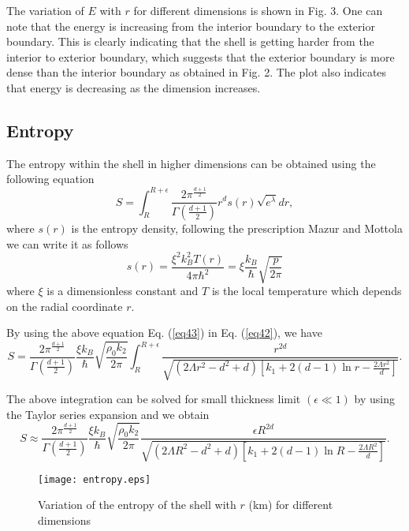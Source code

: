 \documentclass[preprint,12pt]{elsarticle}
\begin{document}
The variation of $E$ with $r$ for different dimensions is shown in Fig. 3.
One can note that the energy is increasing from the interior boundary to
the exterior boundary. This is clearly indicating that the shell is getting
harder from the interior to exterior boundary, which suggests that the
exterior boundary is more dense than the interior boundary as obtained
in Fig. 2. The plot also indicates that energy is decreasing as
the dimension increases.



\subsection{Entropy}
The entropy within the shell in higher dimensions can be obtained using the following equation
\begin{equation}
 S=\int^{R+\epsilon}_R \frac{2\pi^{\frac{d+1}{2}}}{\Gamma(\frac{d+1}{2})} r^d s(r)\sqrt{e^{\lambda}} dr,\label{eq42}
\end{equation}
where $s(r)$ is the entropy density, following the prescription Mazur and Mottola \cite{Mazur2001} we can write it as follows
\begin{equation}
 s(r)=\frac{\xi^2 k_B^2 T(r)}{4\pi\hbar^2}=\xi\frac{k_B}{\hbar}\sqrt{\frac{p}{2\pi}} \label{eq43}
\end{equation}
where $\xi$ is a dimensionless constant and $T$ is the local temperature which depends on the radial coordinate $r$.

By using the above equation Eq. (\ref{eq43}) in Eq. (\ref{eq42}), we have
\begin{equation}
S =  \frac{2\pi^{\frac{d+1}{2}}}{\Gamma(\frac{d+1}{2})}\frac{\xi k_B}{\hbar }\sqrt{\frac{\rho_0 k_2}{2 \pi}}\int_R^{R+\epsilon} \frac{{r^{2d}}}{\sqrt{(2\Lambda r^2 - d^2 + d)[k_1+2(d-1)\ln r-\frac{2\Lambda r^2}{d}]}}. \label{eq44}
\end{equation}

The above integration can be solved for small thickness limit $(\epsilon \ll 1)$
by using the Taylor series expansion and we obtain
\begin{equation}
S \approx \frac{2\pi^{\frac{d+1}{2}}}{\Gamma(\frac{d+1}{2})}\frac{\xi k_B}{\hbar }\sqrt{\frac{\rho_0 k_2}{2 \pi}}
\frac{{\epsilon R^{2d}}}{\sqrt{(2\Lambda R^2 - d^2 + d)[k_1+2(d-1)\ln R-\frac{2\Lambda R^2}{d}]}}. \label{eq45}
\end{equation}


\begin{figure*}[thbp]
\centering
\texttt{[image: entropy.eps]}
\caption{Variation of the entropy of the shell with $r$ (km) for different dimensions }
\end{figure*}
\end{document}
